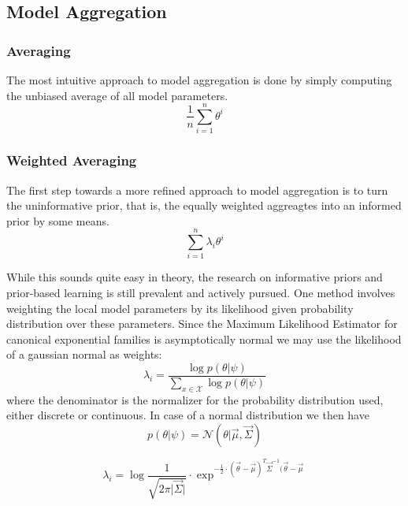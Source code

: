 \subsection{Model Aggregation}

\subsubsection{Averaging}
The most intuitive approach to model aggregation is done by simply computing the unbiased average of all model parameters.
\begin{equation}
    \frac{1}{n} \sum_{i=1}^n \theta^i
\end{equation}
\subsubsection{Weighted Averaging}
The first step towards a more refined approach to model aggregation is to turn the uninformative prior, that is, the equally weighted aggreagtes into an informed prior by some means.
\begin{equation}
     \sum_{i=1}^n \lambda_i \theta^i
\end{equation}

While this sounds quite easy in theory, the research on informative priors and prior-based learning is still prevalent and actively pursued.
One method involves weighting the local model parameters by its likelihood given probability distribution over these parameters.
Since the Maximum Likelihood Estimator for canonical exponential families is asymptotically normal we may use the likelihood of a gaussian normal as weights:
\begin{equation}
    \lambda_i = \frac{\log p(\theta \lvert \psi)}{\sum_{x\in \mathcal{X}} \log p(\theta \lvert \psi)}
\end{equation}
where the denominator is the normalizer for the probability distribution used, either discrete or continuous.
In case of a normal distribution we then have
\begin{equation}
    p(\theta \lvert \psi) = \mathcal{N}(\theta \lvert \vec{\mu}, \vec{\Sigma})
\end{equation}

\begin{equation}
    \lambda_i = \log \frac{1}{\sqrt{2\pi\lvert \vec{\Sigma} \rvert}} \cdot \exp^{-\frac{1}{2} \cdot (\vec{\theta} - \vec{\mu})^T\vec{\Sigma}^{-1}(\vec{\theta} - \vec{\mu}}
\end{equation}
